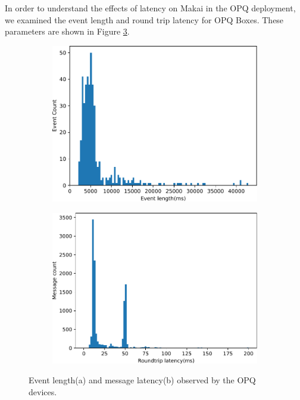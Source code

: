 In order to understand the effects of latency on Makai in the OPQ deployment, we examined the event length and round trip latency for OPQ Boxes.
These parameters are shown in Figure \ref{expdes:fig:el_la}.

\begin{figure}[ht!]
    \centering
    \begin{subfigure}{.45\textwidth}
        \centering
        \includegraphics[width=1\linewidth]{img/napali_eval/event_length.pdf}
        \caption{}
        \label{expdes:fig:event_length}
    \end{subfigure}\hspace{5mm}
    \begin{subfigure}{.45\textwidth}
        \centering
        \includegraphics[width=1\linewidth]{img/napali_eval/latency.pdf}
        \caption{}
        \label{expdes:fig:latency}
    \end{subfigure}
    \caption{Event length(a) and message latency(b) observed by the OPQ devices.}

    \label{expdes:fig:el_la}
\end{figure}

